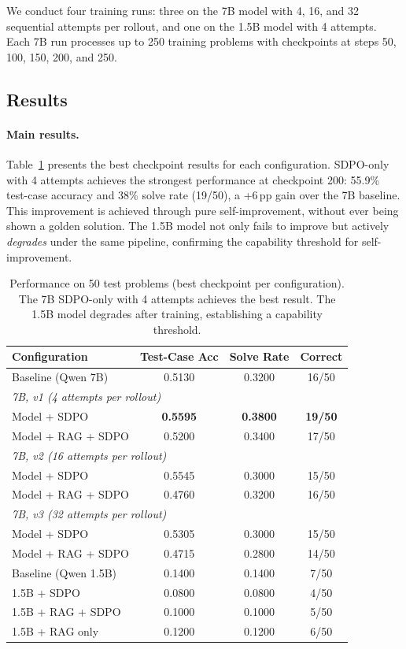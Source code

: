 \documentclass[11pt]{article}
\begin{document}
We conduct four training runs: three on the 7B model with 4, 16, and 32 sequential attempts per rollout, and one on the 1.5B model with 4 attempts. Each 7B run processes up to 250 training problems with checkpoints at steps 50, 100, 150, 200, and 250.

\subsection{Results}

\paragraph{Main results.} Table~\ref{tab:main} presents the best checkpoint results for each configuration. SDPO-only with 4 attempts achieves the strongest performance at checkpoint 200: 55.9\% test-case accuracy and 38\% solve rate (19/50), a +6\,pp gain over the 7B baseline. This improvement is achieved through pure self-improvement, without ever being shown a golden solution. The 1.5B model not only fails to improve but actively \emph{degrades} under the same pipeline, confirming the capability threshold for self-improvement.

\begin{table}[h]
\centering
\begin{tabular}{lccc}
\toprule
\textbf{Configuration} & \textbf{Test-Case Acc} & \textbf{Solve Rate} & \textbf{Correct} \\
\midrule
Baseline (Qwen 7B) & 0.5130 & 0.3200 & 16/50 \\
\midrule
\multicolumn{4}{l}{\textit{7B, v1 (4 attempts per rollout)}} \\
\quad Model + SDPO & \textbf{0.5595} & \textbf{0.3800} & \textbf{19/50} \\
\quad Model + RAG + SDPO & 0.5200 & 0.3400 & 17/50 \\
\midrule
\multicolumn{4}{l}{\textit{7B, v2 (16 attempts per rollout)}} \\
\quad Model + SDPO & 0.5545 & 0.3000 & 15/50 \\
\quad Model + RAG + SDPO & 0.4760 & 0.3200 & 16/50 \\
\midrule
\multicolumn{4}{l}{\textit{7B, v3 (32 attempts per rollout)}} \\
\quad Model + SDPO & 0.5305 & 0.3000 & 15/50 \\
\quad Model + RAG + SDPO & 0.4715 & 0.2800 & 14/50 \\
\midrule
Baseline (Qwen 1.5B) & 0.1400 & 0.1400 & 7/50 \\
\quad 1.5B + SDPO & 0.0800 & 0.0800 & 4/50 \\
\quad 1.5B + RAG + SDPO & 0.1000 & 0.1000 & 5/50 \\
\quad 1.5B + RAG only & 0.1200 & 0.1200 & 6/50 \\
\bottomrule
\end{tabular}
\caption{Performance on 50 test problems (best checkpoint per configuration). The 7B SDPO-only with 4 attempts achieves the best result. The 1.5B model degrades after training, establishing a capability threshold.}
\label{tab:main}
\end{table}
\end{document}
